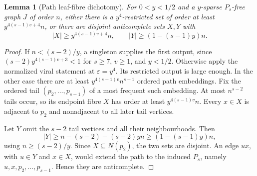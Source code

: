 \documentclass[11pt,a4paper]{article}
\newtheorem{lemma}[theorem]{Lemma}
\theoremstyle{definition}
\theoremstyle{remark}
\numberwithin{equation}{section}
\begin{document}
\begin{lemma}[Path leaf-fibre dichotomy]\label{lem:leaf}
For \(0<y<1/2\) and a \(y\)-sparse \(P_s\)-free graph \(J\) of order \(n\), either there is a \(y^4\)-restricted set of order at least \(y^{4(s-1)v+4}n\), or there are disjoint anticomplete sets \(X,Y\) with
\[
 |X|\ge y^{4(s-1)v+4}n,\qquad |Y|\ge(1-(s-1)y)n.
\]
\end{lemma}
\begin{proof}
If \(n<(s-2)/y\), a singleton supplies the first output, since
\((s-2)y^{4(s-1)v+3}<1\) for \(s\ge7\), \(v\ge1\), and \(y<1/2\).
Otherwise apply the normalized viral statement at \(\varepsilon=y^4\). Its restricted output is large enough. In the other case there are at least \(y^{4(s-1)v}n^{s-1}\) ordered path embeddings. Fix the ordered tail \((p_2,\ldots,p_{s-1})\) of a most frequent such embedding. At most \(n^{s-2}\) tails occur, so its endpoint fibre \(X\) has order at least \(y^{4(s-1)v}n\). Every \(x\in X\) is adjacent to \(p_2\) and nonadjacent to all later tail vertices.

Let \(Y\) omit the \(s-2\) tail vertices and all their neighbourhoods. Then
\[
 |Y|\ge n-(s-2)-(s-2)yn\ge(1-(s-1)y)n,
\]
using \(n\ge(s-2)/y\). Since \(X\subseteq N(p_2)\), the two sets are disjoint. An edge \(ux\), with \(u\in Y\) and \(x\in X\), would extend the path to the induced \(P_s\), namely \(u,x,p_2,\ldots,p_{s-1}\). Hence they are anticomplete.
\end{proof}
\end{document}
